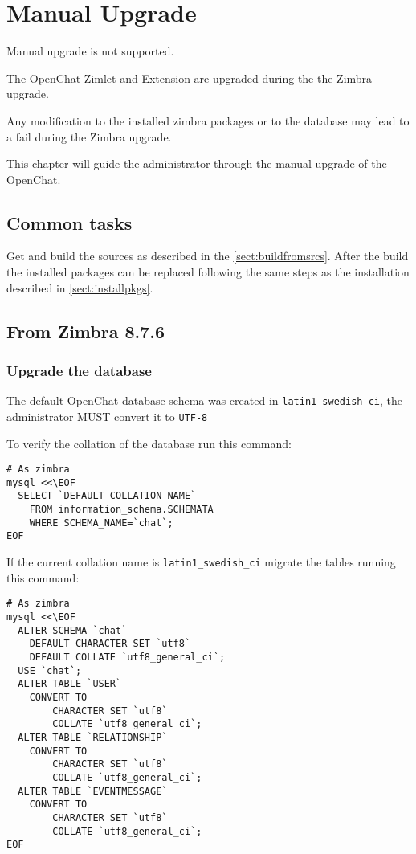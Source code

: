 \section{Manual Upgrade}

\begin{warning}
    Manual upgrade is not supported.

    The OpenChat Zimlet and Extension are upgraded during the the Zimbra upgrade.

    Any modification to the installed zimbra packages or to the database may lead to a fail during the Zimbra upgrade.
\end{warning}

This chapter will guide the administrator through the manual upgrade of the OpenChat.

\subsection{Common tasks}

    Get and build the sources as described in the \autoref{sect:buildfromsrcs}. After the build the installed packages
    can be replaced following the same steps as the installation described in \autoref{sect:installpkgs}.

\subsection{From Zimbra 8.7.6}
    \subsubsection{Upgrade the database}

        The default OpenChat database schema was created in \verb+latin1_swedish_ci+, the administrator MUST convert it to \verb+UTF-8+

        To verify the collation of the database run this command:
        \begin{verbatim}
# As zimbra
mysql <<\EOF
  SELECT `DEFAULT_COLLATION_NAME`
    FROM information_schema.SCHEMATA
    WHERE SCHEMA_NAME=`chat`;
EOF
        \end{verbatim}

        If the current collation name is \verb+latin1_swedish_ci+ migrate the tables running this command:
        \begin{verbatim}
# As zimbra
mysql <<\EOF
  ALTER SCHEMA `chat`
    DEFAULT CHARACTER SET `utf8`
    DEFAULT COLLATE `utf8_general_ci`;
  USE `chat`;
  ALTER TABLE `USER`
    CONVERT TO
        CHARACTER SET `utf8`
        COLLATE `utf8_general_ci`;
  ALTER TABLE `RELATIONSHIP`
    CONVERT TO
        CHARACTER SET `utf8`
        COLLATE `utf8_general_ci`;
  ALTER TABLE `EVENTMESSAGE`
    CONVERT TO
        CHARACTER SET `utf8`
        COLLATE `utf8_general_ci`;
EOF
        \end{verbatim}

